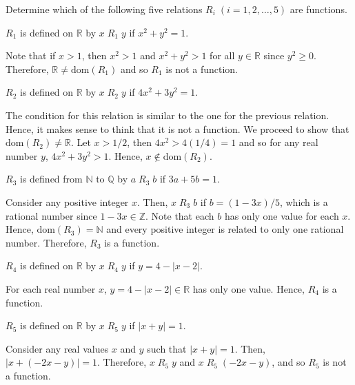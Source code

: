 \documentclass[12pt]{article}
\newcommand{\N}{\mathbb{N}}
\newcommand{\Z}{\mathbb{Z}}
\newcommand{\R}{\mathbb{R}}
\newcommand{\Q}{\mathbb{Q}}
\newcommand{\dom}[1]{\mathrm{dom}\left(#1\right)}
\newcommand{\rel}[3]{#2\; #1\; #3}
\newenvironment{problem}[2][Problem]{\begin{trivlist} \item[\hskip \labelsep {\bfseries #1}\hskip \labelsep {\bfseries #2.}]}{\end{trivlist}}
\newenvironment{solution}[2][Solution]{\begin{trivlist} \item[\hskip \labelsep {\bfseries #1}\hskip \labelsep {\bfseries #2.}]}{\end{trivlist}}
\begin{document}
    \begin{problem}{9}
	Determine which of the following five relations $R_{i}\; (i=1,2,\dots,5)$ are functions.
     \begin{enumerate}[label=(\alph*)]
       \item $R_{1}$ is defined on $\R$ by $x\; R_{1}\;y$ if $x^{2}+y^{2}=1$. 
	 \begin{solution}{(a)}
	   Note that if $x>1$, then $x^{2}> 1$ and $x^{2}+y^{2}> 1$ for all $y\in\R$ since $y^{2}\geq 0$. Therefore, $\R \neq \text{dom}(R_{1})$ and so $R_{1}$ is not a function.
         \end{solution}
       \item $R_{2}$ is defined on $\R$ by $x\; R_{2}\;y$ if $4x^{2}+3y^{2}=1$.
	 \begin{solution}{(b)}
	   The condition for this relation is similar to the one for the previous relation. Hence, it makes sense to think that it is not a function. We proceed to show that $\dom{R_2}\neq \R$. Let  $x>1/2$, then $4x^{2} > 4(1/4) =1$ and so for any real number $y$, $4x^{2} + 3y^{2} > 1$. Hence, $x\not\in \dom{R_{2}}$. 
         \end{solution}
       \item $R_{3}$ is defined from $\N$ to $\Q$ by $a\; R_{3}\;b$ if $3a+5b=1$.
	 \begin{solution}{(c)}
             Consider any positive integer $x$. Then, $\rel{R_{3}}{x}{b}$ if $b=(1-3x)/5$, which is a rational number since $1-3x\in\Z$. Note that each $b$ has only one value for each $x$. Hence, $\dom{R_{3}}=\N$ and every positive integer is related to only one rational number. Therefore, $R_{3}$ is a function.
         \end{solution}
       \item $R_{4}$ is defined on $\R$ by $x\; R_{4}\;y$ if $y=4-|x-2|$.
	 \begin{solution}{(d)}
	   For each real number $x$, $y=4-|x-2|\in \R$ has only one value. Hence, $R_{4}$ is a function.  
         \end{solution}
       \item $R_{5}$ is defined on $\R$ by $x\; R_{5}\;y$ if $|x+y|=1$.
	 \begin{solution}{(e)}
	   Consider any real values $x$ and $y$ such that $|x+y|=1$. Then, $|x+(-2x-y)| =1$. Therefore, $\rel{R_{5}}{x}{y}$ and $\rel{R_{5}}{x}{(-2x-y)}$, and so $R_{5}$ is not a function.
         \end{solution}
     \end{enumerate}
    \end{problem}
\end{document}
